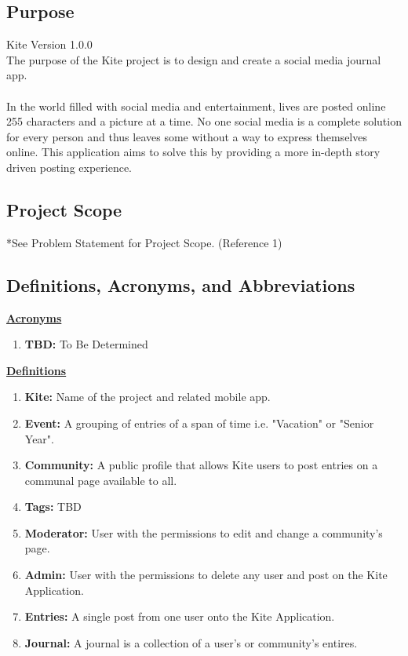 \documentclass[letterpaper, 10, draftclsnofoot, onecolumn]{IEEEtran}
\begin{document}
\subsection{Purpose}

Kite Version 1.0.0
\\
\indent The purpose of the Kite project is to design and create a social media journal app. 
\\ \\
\indent In the world filled with social media and entertainment, lives are 
posted online 255 characters and a picture at a time. No one social media is 
a complete solution for every person and thus leaves some without a way to 
express themselves online. This application aims to solve this by providing 
a more in-depth story driven posting experience.

\subsection{Project Scope}
 *See Problem Statement for Project Scope. (Reference 1)

\subsection{Definitions, Acronyms, and Abbreviations}
\underline{\textbf{Acronyms}}
\begin{enumerate}
\item \textbf{TBD: } To Be Determined 
\end{enumerate}

\underline{\textbf{Definitions}}
\begin{enumerate}
\item \textbf{Kite: } Name of the project and related mobile app.
\item \textbf{Event: } A grouping of entries of a span of time i.e. "Vacation" or "Senior Year".
\item \textbf{Community: } A public profile that allows Kite users to post entries on a communal page available to all.
\item \textbf{Tags: } TBD
\item \textbf{Moderator: } User with the permissions to edit and change a community's page.
\item \textbf{Admin: } User with the permissions to delete any user and post on the Kite Application.
\item \textbf{Entries: } A single post from one user onto the Kite Application.
\item \textbf{Journal: } A journal is a collection of a user's or community's entires.
\end{enumerate}
\end{document}
